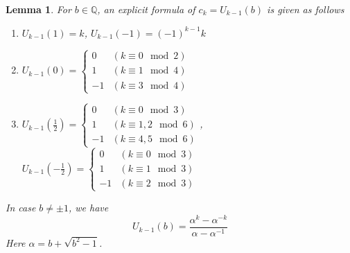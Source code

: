 \documentclass[a4paper, 11pt]{amsart}
\numberwithin{equation}{section}
\newtheorem{lem}[thm]{Lemma}
\theoremstyle{definition}
\newcommand{\Q}{\mathbb{Q}}
\begin{document}
\begin{lem}\label{lem-Ck}
For $b\in \Q$, an explicit formula of $c_k=U_{k-1}(b)$ is given as follows
\begin{enumerate}[{\rm (1)}]
\item
$U_{k-1}(1)=k$,\quad
$U_{k-1}(-1)=(-1)^{k-1}k$

\item
$
U_{k-1}(0)
=
\begin{cases}
0&(k\equiv 0 \mod 2)\\
1&(k\equiv 1 \mod 4)\\
-1&(k\equiv 3 \mod 4)
\end{cases}
$
\item
$
U_{k-1}(\frac12)
=
\begin{cases}
0&(k\equiv 0 \mod 3)\\
1&(k\equiv 1,2 \mod 6)\\
-1&(k\equiv 4,5 \mod 6)
\end{cases}
$,\quad 
$
U_{k-1}(-\frac12)
=
\begin{cases}
0&(k\equiv 0 \mod 3)\\
1&(k\equiv 1 \mod 3)\\
-1&(k\equiv 2 \mod 3)
\end{cases}
$
\end{enumerate}
In case $b\neq \pm1$, we have
\[
U_{k-1}(b)
=
\frac{\alpha^k-\alpha^{-k}}{\alpha-\alpha^{-1}}
\]
Here $\alpha=b+\sqrt{b^2-1}$.
\end{lem}
\end{document}
